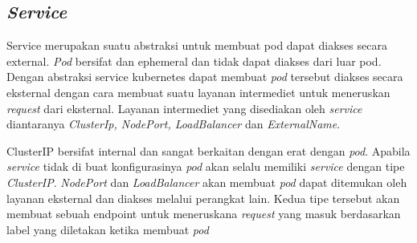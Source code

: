 \subsection{\textit{Service}}

Service merupakan suatu abstraksi untuk membuat pod dapat diakses secara external. \textit{Pod} bersifat dan ephemeral dan tidak dapat diakses dari luar pod. Dengan abstraksi service kubernetes dapat membuat \textit{pod} tersebut diakses secara eksternal dengan cara membuat suatu layanan intermediet untuk meneruskan \textit{request} dari eksternal.
Layanan intermediet yang disediakan oleh \textit{service} diantaranya \textit{ClusterIp, NodePort, LoadBalancer} dan  \textit{ExternalName}.

ClusterIP bersifat internal dan sangat berkaitan dengan erat dengan \textit{pod}. Apabila \textit{service} tidak di buat konfigurasinya \textit{pod} akan selalu memiliki \textit{service} dengan tipe \textit{ClusterIP}. \textit{NodePort} dan \textit{LoadBalancer} akan membuat \textit{pod} dapat ditemukan oleh layanan eksternal dan diakses melalui perangkat lain. Kedua tipe tersebut akan membuat sebuah endpoint untuk meneruskana \textit{request} yang masuk berdasarkan label yang diletakan ketika membuat \textit{pod} \parencite{service}